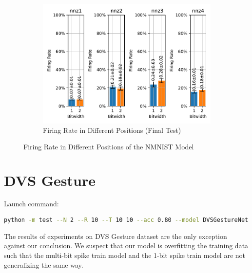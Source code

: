         \begin{figure}[H]
            \centering
            \ContinuedFloat
            \begin{subfigure}[H]{\textwidth}
                \centering
                \includegraphics[width=\textwidth]{../firerate/NMNIST/plots/nmnist_final_firerate.pdf}
                \caption{Firing Rate in Different Positions (Final Test)}
            \end{subfigure}
            \caption{Firing Rate in Different Positions of the NMNIST Model}
        \end{figure}

    \section{DVS Gesture}
    \label{appendix:firerate_dvs_gesture}
        Launch command: 
        \begin{lstlisting}[language=Bash, basicstyle=\small, breaklines=true]
python -m test --N 2 --R 10 --T 10 10 --acc 0.80 --model DVSGestureNet --data-path /scratch/zyi/codeSpace/data --dataset DVSGesture --batch-size 128 --opt adam --lr 1e-3 --lr-scheduler cosa --epochs 200 --lr-warmup-epochs 0 --output-dir /scratch/zyi/codeSpace/MultibitSpikes/firerate
        \end{lstlisting}

        The results of experiments on DVS Gesture dataset are the only exception against our conclusion. We suspect that our model is overfitting the training data such that the multi-bit spike train model and the 1-bit spike train model are not generalizing the same way. 

